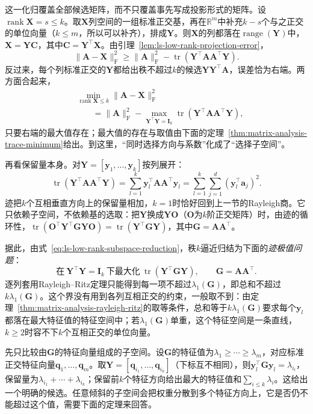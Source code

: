 这一化归覆盖全部候选矩阵，而不只覆盖事先写成投影形式的矩阵。设$\operatorname{rank}\bm X=s\leq k$。取$\bm X$列空间的一组标准正交基，再在$\mathbb R^m$中补充$k-s$个与之正交的单位向量（$k\leq m$，所以可以补齐），排成$\bm Y$。则$\bm X$的列都落在$\operatorname{range}(\bm Y)$中，$\bm X=\bm Y\bm C$，其中$\bm C=\bm Y^\top\bm X$。由引理~\ref{lem:ls-low-rank-projection-error}，
\[
 \lVert\bm A-\bm X\rVert_{\mathrm F}^2\geq\lVert\bm A\rVert_{\mathrm F}^2-\operatorname{tr}(\bm Y^\top\bm A\bm A^\top\bm Y).
\]
反过来，每个列标准正交的$\bm Y$都给出秩不超过$k$的候选$\bm Y\bm Y^\top\bm A$，误差恰为右端。两方面合起来，
\begin{equation}
 \begin{aligned}
 &\min_{\operatorname{rank}\bm X\leq k}\lVert\bm A-\bm X\rVert_{\mathrm F}^2\\
 &\qquad=\lVert\bm A\rVert_{\mathrm F}^2-\max_{\bm Y^\top\bm Y=\bm I_k}\operatorname{tr}(\bm Y^\top\bm A\bm A^\top\bm Y),
 \end{aligned}
 \label{eq:ls-low-rank-subspace-reduction}
\end{equation}
只要右端的最大值存在；最大值的存在与取值由下面的定理~\ref{thm:matrix-analysis-trace-minimum}给出。到这里，“同时选择方向与系数”化成了“选择子空间”。

再看保留量本身。对$\bm Y=[\bm y_1,\ldots,\bm y_k]$按列展开：
\[
 \operatorname{tr}(\bm Y^\top\bm A\bm A^\top\bm Y)
 =\sum_{l=1}^k\bm y_l^\top\bm A\bm A^\top\bm y_l
 =\sum_{l=1}^k\sum_{j=1}^d(\bm y_l^\top\bm a_j)^2 .
\]
迹把$k$个互相垂直方向上的保留量相加，$k=1$时恰好回到上一节的Rayleigh商。它只依赖子空间，不依赖基的选取：把$\bm Y$换成$\bm Y\bm O$（$\bm O$为$k$阶正交矩阵）时，由迹的循环性，$\operatorname{tr}(\bm O^\top\bm Y^\top\bm G\bm Y\bm O)=\operatorname{tr}(\bm Y^\top\bm G\bm Y)$，其中$\bm G=\bm A\bm A^\top$。

据此，由式~\eqref{eq:ls-low-rank-subspace-reduction}，秩$k$逼近归结为下面的\emph{迹极值问题}：
\[
 \text{在}\ \bm Y^\top\bm Y=\bm I_k\ \text{下最大化}\ \operatorname{tr}(\bm Y^\top\bm G\bm Y),\qquad\bm G=\bm A\bm A^\top .
\]
逐列套用Rayleigh--Ritz定理只能得到每一项不超过$\lambda_1(\bm G)$，即总和不超过$k\lambda_1(\bm G)$。这个界没有用到各列互相正交的约束，一般取不到：由定理~\ref{thm:matrix-analysis-rayleigh-ritz}的取等条件，总和等于$k\lambda_1(\bm G)$要求每个$\bm y_l$都落在最大特征值的特征空间中；若$\lambda_1(\bm G)$单重，这个特征空间是一条直线，$k\geq2$时容不下$k$个互相正交的单位向量。

先只比较由$\bm G$的特征向量组成的子空间。设$\bm G$的特征值为$\lambda_1\geq\cdots\geq\lambda_m$，对应标准正交特征向量$\bm q_1,\ldots,\bm q_m$。取$\bm Y=[\bm q_{i_1},\ldots,\bm q_{i_k}]$（下标互不相同），则$\bm y_l^\top\bm G\bm y_l=\lambda_{i_l}$，保留量为$\lambda_{i_1}+\cdots+\lambda_{i_k}$；保留前$k$个特征方向给出最大的特征值和$\sum_{i\leq k}\lambda_i$。这给出一个明确的候选。任意倾斜的子空间会把权重分散到多个特征方向上，它是否仍不能超过这个值，需要下面的定理来回答。

